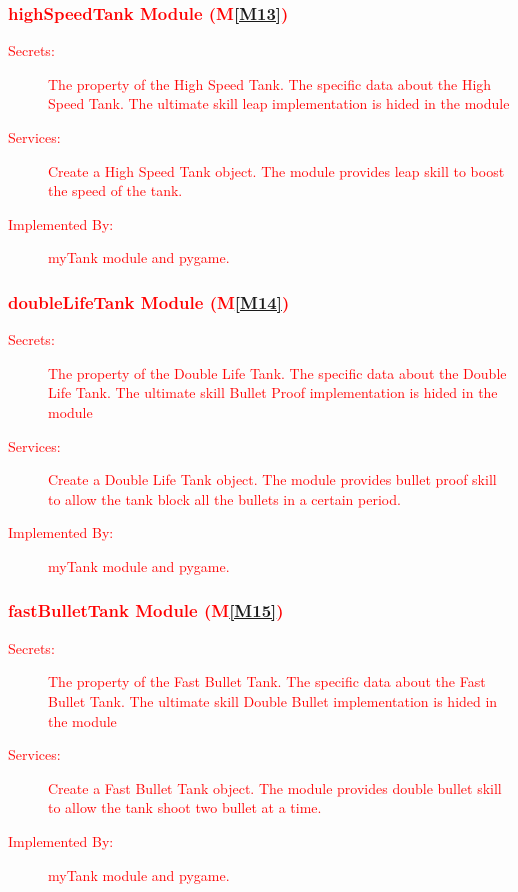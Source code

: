 \documentclass[12pt, titlepage]{article}
\newcommand{\mref}[1]{M\ref{#1}}
\begin{document}
\subsubsection{\textcolor{red}{highSpeedTank Module (\mref{M13})}}
\begin{description}
\item[\textcolor{red}{Secrets:}]\textcolor{red}{The property of the High Speed Tank. The specific data about the High Speed Tank. The ultimate skill leap implementation is hided in the module}
\item[\textcolor{red}{Services:}] \textcolor{red}{Create a High Speed Tank object. The module provides leap skill to boost the speed of the tank.}
\item[\textcolor{red}{Implemented By:}] \textcolor{red}{myTank module and pygame.}
\end{description}

\subsubsection{\textcolor{red}{doubleLifeTank Module  (\mref{M14})}}
\begin{description}
\item[\textcolor{red}{Secrets:}]\textcolor{red}{The property of the Double Life Tank. The specific data about the Double Life Tank. The ultimate skill Bullet Proof implementation is hided in the module}
\item[\textcolor{red}{Services:}] \textcolor{red}{Create a Double Life Tank object. The module provides bullet proof skill to allow the tank block all the bullets in a certain period.}
\item[\textcolor{red}{Implemented By:}] \textcolor{red}{myTank module and pygame.}
\end{description}

\subsubsection{\textcolor{red}{fastBulletTank Module (\mref{M15})}}
\begin{description}
\item[\textcolor{red}{Secrets:}]\textcolor{red}{The property of the Fast Bullet Tank. The specific data about the Fast Bullet Tank. The ultimate skill Double Bullet implementation is hided in the module}
\item[\textcolor{red}{Services:}] \textcolor{red}{Create a Fast Bullet Tank object. The module provides double bullet skill to allow the tank shoot two bullet at a time.}
\item[\textcolor{red}{Implemented By:}] \textcolor{red}{myTank module and pygame.}
\end{description}
\end{document}
